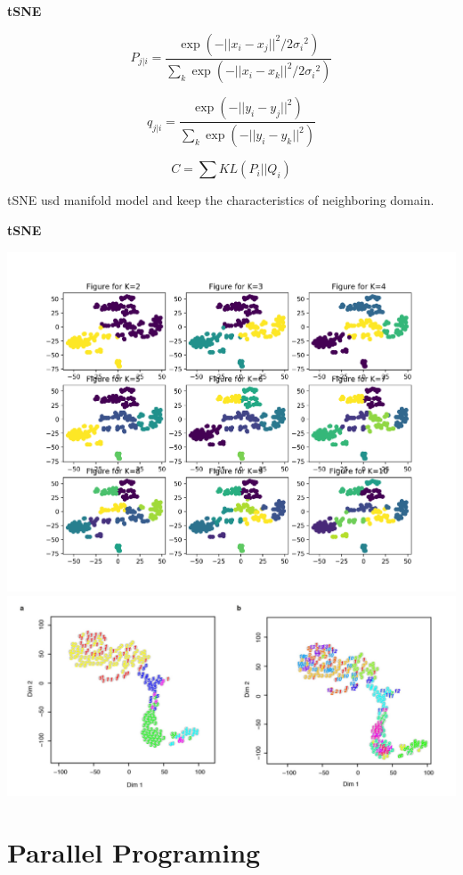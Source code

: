\documentclass[12pt]{beamer}
\begin{document}
\begin{frame}{\textbf{tSNE}}

\[P_{j|i}=\frac{\exp(-||x_i-x_j||^2 /2{\sigma_i}^2)}{\sum_k \exp(-||x_i-x_k||^2 /2{\sigma_i}^2)}\]

\[q_{j|i}=\frac{\exp(-||y_i-y_j||^2)}{\sum_k \exp(-||y_i-y_k||^2 )}\]

\[C=\sum KL(P_i||Q_i)\]

tSNE usd manifold model and keep the characteristics of neighboring domain. 
\end{frame}




\begin{frame}{\textbf{tSNE}}


\includegraphics[scale=0.23]{fig2/tSNE.png}
\includegraphics[scale=0.23]{fig2/tSNE2.png}
\end{frame}




\section{Parallel Programing }
\end{document}
